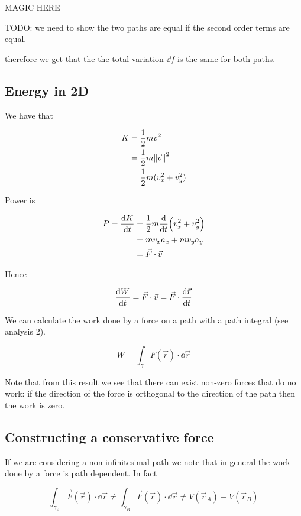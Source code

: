 \documentclass[10pt]{extarticle}
\begin{document}
MAGIC HERE

TODO: we need to show the two paths are equal if the second order terms are equal.

therefore we get that the the total variation $\dd{f}$ is the same for both paths.

\subsection{Energy in 2D}

We have that

\begin{align*}
  K & = \frac{1}{2} m v^2              \\
    & = \frac{1}{2} m \norm{\vec{v}}^2 \\
    & = \frac{1}{2} m (v_x^2 + v_y^2)  \\
\end{align*}

Power is

\begin{align*}
  P = \dv{K}{t} & = \frac{1}{2}m \dv{t} (v_x^2 + v_y^2) \\
                & = m v_x a_x + m v_y a_y               \\
                & = \vec F \cdot \vec v
\end{align*}

Hence

$$
  \dv{W}{t} = \vec F \cdot \vec v = \vec F \cdot \dv{\vec r}{t}
$$

We can calculate the work done by a force on a path with a path integral (see analysis 2).

$$
  W = \int_{\gamma} F(\vec{r}) \cdot \dd{\vec{r}}
$$

Note that from this result we see that there can exist non-zero forces that do no work:
if the direction of the force is orthogonal to the direction of the path then the work is zero.

\subsection{Constructing a conservative force}

If we are considering a non-infinitesimal path we note that in general the work done by a force is path dependent.
In fact

$$
  \int_{\gamma_A} \vec{F}(\vec{r}) \cdot \dd \vec{r} \neq \int_{\gamma_B} \vec{F}(\vec{r}) \cdot \dd \vec{r} \ne V(\vec{r}_A) - V(\vec{r}_B)
$$
\end{document}
